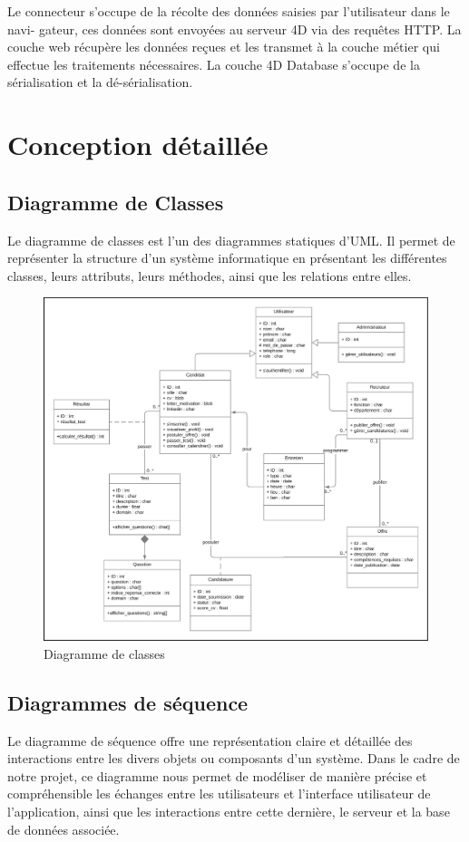 Le connecteur s’occupe de la récolte des données saisies par l’utilisateur dans le navi- gateur, ces données sont envoyées au serveur 4D via des requêtes HTTP. La couche web récupère les données reçues et les transmet à la couche métier qui effectue les traitements nécessaires. La couche 4D Database s’occupe de la sérialisation et la dé-sérialisation.

\section{Conception détaillée}
\subsection{Diagramme de Classes}
Le diagramme de classes est l'un des diagrammes statiques d'UML. 
Il permet de représenter la structure d'un système informatique en 
présentant les différentes classes, leurs attributs, leurs méthodes, 
ainsi que les relations entre elles.

\begin{figure}[htbp]
   \centering
   \includegraphics[scale=0.3]{Images/classDiagram.png} %
   \caption{Diagramme de classes}
   \label{fig:ClassDiag}
\end{figure}


\subsection{Diagrammes de séquence}
Le diagramme de séquence offre une représentation claire 
et détaillée des interactions entre les divers objets ou 
composants d’un système. Dans le cadre de notre projet, 
ce diagramme nous permet de modéliser de manière précise et 
compréhensible les échanges entre les utilisateurs et l’interface 
utilisateur de l’application, ainsi que les interactions entre cette 
dernière, le serveur et la base de données associée.

